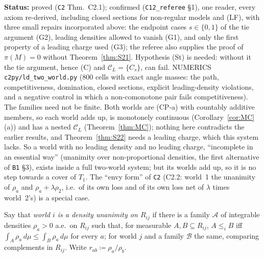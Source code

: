 \documentclass[11pt]{article}
\theoremstyle{definition}
\theoremstyle{remark}
\newcommand{\C}{\mathcal C}
\newcommand{\src}[1]{\texttt{#1}}
\newcommand{\status}[1]{\par\smallskip\noindent\textbf{Status:} #1\par\smallskip}
\begin{document}
\status{proved (\src{C2} Thm.~C2.1); confirmed (\src{C12\_referee} \S1), one reader, every axiom re-derived, including closed sections for non-regular models and (LF), with three small repairs incorporated above: the endpoint cases $s\in\{0,1\}$ of the tie argument (G2), leading densities allowed to vanish (G1), and only the first property of a leading charge used (G3); the referee also supplies the proof of $\pi(M)=0$ without Theorem~\ref{thm:S21}. Hypothesis (St) is needed: without it the tie argument, hence (C) and $\C_L=\{C_s\}$, can fail. NUMERICS \src{c2py/ld\_two\_world.py} (800 cells with exact angle masses: the path, competitiveness, domination, closed sections, explicit leading-density violations, and a negative control in which a non-comonotone pair fails competitiveness). The families need not be finite. Both worlds are (CP-a) with countably additive members, so each world adds up, is monotonely continuous (Corollary~\ref{cor:MC}(a)) and has a nested $\C_L$ (Theorem~\ref{thm:MC}); nothing here contradicts the earlier results, and Theorem~\ref{thm:S22} needs a leading charge, which this system lacks. So a world with no leading density and no leading charge, ``incomplete in an essential way'' (unanimity over non-proportional densities, the first alternative of \src{B1} \S3), exists inside a full two-world system; but its worlds add up, so it is no step towards a cover of $T_1$. The ``envy form'' of \src{C2} (C2.2: world~1 the unanimity of $\rho_a$ and $\rho_a+\lambda\rho_2$, i.e.\ of its own loss and of its own loss net of $\lambda$ times world~2's) is a special case.}

Say that \emph{world $i$ is a density unanimity on $R_{ij}$} if there is a family $\mathcal A$ of integrable densities $\rho_a>0$ a.e.\ on $R_{ij}$ such that, for measurable $A,B\subseteq R_{ij}$, $A\le_iB$ iff $\int_A\rho_a\,d\mu\le\int_B\rho_a\,d\mu$ for every $a$; for world $j$ and a family $\mathcal B$ the same, comparing complements in $R_{ij}$. Write $r_{ab}\coloneqq\rho_a/\rho_b$.
\end{document}
